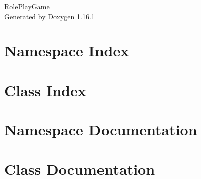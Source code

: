 \documentclass[twoside]{book}
\newcommand{\+}{\discretionary{\mbox{\scriptsize$\hookleftarrow$}}{}{}}
\newcommand{\clearemptydoublepage}{%
    \newpage{\pagestyle{empty}\cleardoublepage}%
  }
\begin{document}
  \raggedbottom
    \hypersetup{pageanchor=false,
                bookmarksnumbered=true,
                pdfencoding=unicode
               }
  \begin{titlepage}
  \vspace*{7cm}
  \begin{center}%
  {\Large Role\+Play\+Game}\\
  \vspace*{1cm}
  {\large Generated by Doxygen 1.16.1}\\
  \end{center}
  \end{titlepage}
  \clearemptydoublepage
  \tableofcontents
  \clearemptydoublepage
  \hypersetup{pageanchor=true}
\chapter{Namespace Index}

\chapter{Class Index}

\chapter{Namespace Documentation}



\chapter{Class Documentation}



  \backmatter
  \newpage
  \clearemptydoublepage
  \printindex
\end{document}

